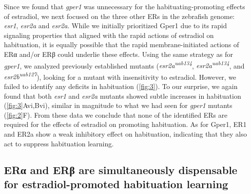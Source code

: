 \documentclass[9.5pt,lineno]{RandlettLab_elife}
\begin{document}
{\begin{figure}
\begin{fullwidth}
\begin{center}
\label{fig:3}

\end{center}
\end{fullwidth}
\end{figure}

Since we found that \emph{gper1} was unnecessary for the habituating-promoting effects of estradiol, we next focused on the three other ERs in the zebrafish genome: \emph{esr1}, \emph{esr2a} and \emph{esr2a}. 
While we initially prioritized Gper1 due to its rapid signaling properties that aligned with the rapid actions of estradiol on habituation, it is equally possible that the rapid membrane-initiated actions of ERα and/or ERβ could underlie these effects.
Using the same strategy as for \emph{gper1}, we analyzed previously established mutants (\emph{esr2a\textsuperscript{uab134}}, \emph{esr2a\textsuperscript{uab134}}, and \emph{esr2b\textsuperscript{uab127}}), looking for a mutant with insensitivity to estradiol. 
However, we failed to identify any deficits in habituation (\autoref{fig:3}).
To our surprise, we again found that both \emph{esr1} and \emph{esr2a} mutants showed subtle increases in habituation (\autoref{fig:3}Avi,Bvi), similar in magnitude to what we had seen for \emph{gper1} mutants (\autoref{fig:2}F). 
From these data we conclude that none of the identified ERs are required for the effects of estradiol on promoting habituation. As for Gper1, ER1 and ER2a show a weak inhibitory effect on habituation, indicating that they also act to suppress habituation learning.

\subsection{ERα and ERβ are simultaneously dispensable for estradiol-promoted habituation learning}

}
\end{document}
